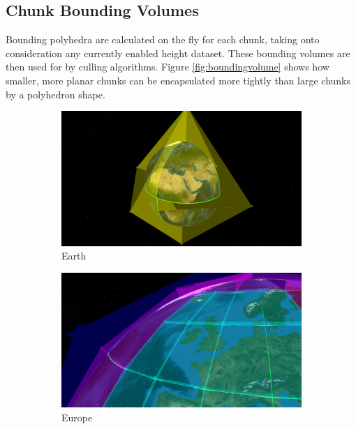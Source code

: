 \subsection{Chunk Bounding Volumes}
\FloatBarrier
Bounding polyhedra are calculated on the fly for each chunk, taking onto consideration any currently enabled height dataset. These bounding volumes are then used for by culling algorithms. Figure \ref{fig:boundingvolume} shows how smaller, more planar chunks can be encapsulated more tightly than large chunks by a polyhedron shape.
\begin{figure}[h]
    \centering
    \begin{subfigure}[bt]{0.45\textwidth}
        \includegraphics[width=\textwidth]{figures/results/culling/bbox_earth.png}
        \caption{Earth}
    \end{subfigure}
    \begin{subfigure}[bt]{0.45\textwidth}
        \includegraphics[width=\textwidth]{figures/results/culling/bbox_europe.png}
        \caption{Europe}
    \end{subfigure}
    \begin{subfigure}[bt]{0.45\textwidth}

\end{subfigure}
\end{figure}
